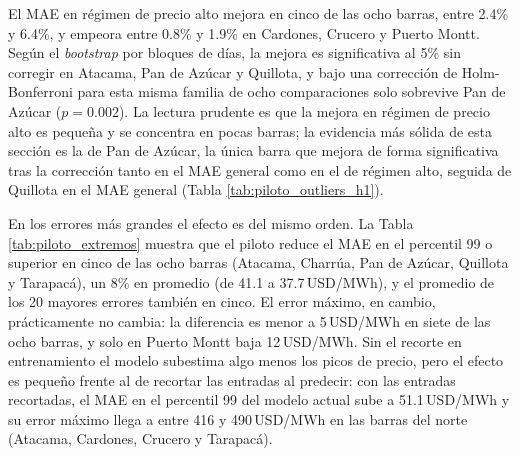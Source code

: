 El MAE en régimen de precio alto mejora en cinco de las ocho barras, entre 2.4\% y 6.4\%, y empeora entre 0.8\% y 1.9\% en Cardones, Crucero y Puerto Montt. Según el \textit{bootstrap} por bloques de días, la mejora es significativa al 5\% sin corregir en Atacama, Pan de Azúcar y Quillota, y bajo una corrección de Holm-Bonferroni para esta misma familia de ocho comparaciones solo sobrevive Pan de Azúcar ($p=0.002$). La lectura prudente es que la mejora en régimen de precio alto es pequeña y se concentra en pocas barras; la evidencia más sólida de esta sección es la de Pan de Azúcar, la única barra que mejora de forma significativa tras la corrección tanto en el MAE general como en el de régimen alto, seguida de Quillota en el MAE general (Tabla \ref{tab:piloto_outliers_h1}).

En los errores más grandes el efecto es del mismo orden. La Tabla \ref{tab:piloto_extremos} muestra que el piloto reduce el MAE en el percentil 99 o superior en cinco de las ocho barras (Atacama, Charrúa, Pan de Azúcar, Quillota y Tarapacá), un 8\% en promedio (de 41.1 a 37.7\,USD/MWh), y el promedio de los 20 mayores errores también en cinco. El error máximo, en cambio, prácticamente no cambia: la diferencia es menor a 5\,USD/MWh en siete de las ocho barras, y solo en Puerto Montt baja 12\,USD/MWh. Sin el recorte en entrenamiento el modelo subestima algo menos los picos de precio, pero el efecto es pequeño frente al de recortar las entradas al predecir: con las entradas recortadas, el MAE en el percentil 99 del modelo actual sube a 51.1\,USD/MWh y su error máximo llega a entre 416 y 490\,USD/MWh en las barras del norte (Atacama, Cardones, Crucero y Tarapacá).

